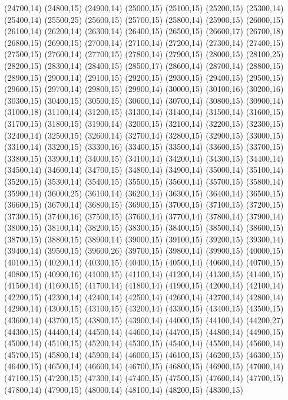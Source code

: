 (24700,14)
(24800,15)
(24900,14)
(25000,15)
(25100,15)
(25200,15)
(25300,14)
(25400,14)
(25500,25)
(25600,15)
(25700,15)
(25800,14)
(25900,15)
(26000,15)
(26100,14)
(26200,14)
(26300,14)
(26400,15)
(26500,15)
(26600,17)
(26700,18)
(26800,15)
(26900,15)
(27000,14)
(27100,14)
(27200,14)
(27300,14)
(27400,15)
(27500,15)
(27600,14)
(27700,15)
(27800,14)
(27900,15)
(28000,15)
(28100,25)
(28200,15)
(28300,14)
(28400,15)
(28500,17)
(28600,14)
(28700,14)
(28800,15)
(28900,15)
(29000,14)
(29100,15)
(29200,15)
(29300,15)
(29400,15)
(29500,15)
(29600,15)
(29700,14)
(29800,15)
(29900,14)
(30000,15)
(30100,16)
(30200,16)
(30300,15)
(30400,15)
(30500,15)
(30600,14)
(30700,14)
(30800,15)
(30900,14)
(31000,18)
(31100,14)
(31200,15)
(31300,14)
(31400,14)
(31500,14)
(31600,15)
(31700,15)
(31800,15)
(31900,14)
(32000,15)
(32100,14)
(32200,15)
(32300,15)
(32400,14)
(32500,15)
(32600,14)
(32700,14)
(32800,15)
(32900,15)
(33000,15)
(33100,14)
(33200,15)
(33300,16)
(33400,15)
(33500,14)
(33600,15)
(33700,15)
(33800,15)
(33900,14)
(34000,15)
(34100,14)
(34200,14)
(34300,15)
(34400,14)
(34500,14)
(34600,14)
(34700,15)
(34800,14)
(34900,14)
(35000,14)
(35100,14)
(35200,15)
(35300,14)
(35400,15)
(35500,15)
(35600,14)
(35700,15)
(35800,14)
(35900,14)
(36000,25)
(36100,14)
(36200,14)
(36300,15)
(36400,14)
(36500,15)
(36600,15)
(36700,14)
(36800,15)
(36900,15)
(37000,15)
(37100,15)
(37200,15)
(37300,15)
(37400,16)
(37500,15)
(37600,14)
(37700,14)
(37800,14)
(37900,14)
(38000,15)
(38100,14)
(38200,15)
(38300,15)
(38400,15)
(38500,14)
(38600,15)
(38700,15)
(38800,15)
(38900,14)
(39000,15)
(39100,15)
(39200,15)
(39300,14)
(39400,14)
(39500,15)
(39600,26)
(39700,15)
(39800,14)
(39900,15)
(40000,15)
(40100,15)
(40200,14)
(40300,15)
(40400,15)
(40500,14)
(40600,14)
(40700,15)
(40800,15)
(40900,16)
(41000,15)
(41100,14)
(41200,14)
(41300,15)
(41400,15)
(41500,14)
(41600,15)
(41700,14)
(41800,14)
(41900,15)
(42000,14)
(42100,14)
(42200,15)
(42300,14)
(42400,14)
(42500,14)
(42600,14)
(42700,14)
(42800,14)
(42900,14)
(43000,15)
(43100,15)
(43200,14)
(43300,15)
(43400,15)
(43500,15)
(43600,14)
(43700,15)
(43800,15)
(43900,14)
(44000,15)
(44100,14)
(44200,27)
(44300,15)
(44400,14)
(44500,14)
(44600,14)
(44700,15)
(44800,14)
(44900,15)
(45000,14)
(45100,15)
(45200,14)
(45300,15)
(45400,14)
(45500,14)
(45600,14)
(45700,15)
(45800,14)
(45900,14)
(46000,15)
(46100,15)
(46200,15)
(46300,15)
(46400,15)
(46500,14)
(46600,14)
(46700,15)
(46800,15)
(46900,15)
(47000,14)
(47100,15)
(47200,15)
(47300,14)
(47400,15)
(47500,15)
(47600,14)
(47700,15)
(47800,14)
(47900,15)
(48000,14)
(48100,14)
(48200,15)
(48300,15)
